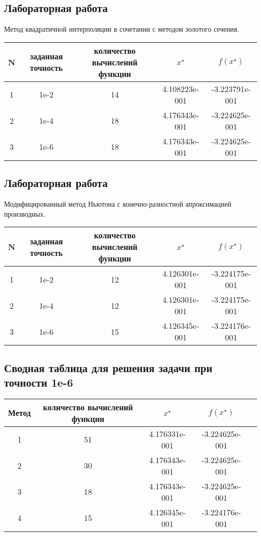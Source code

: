 \documentclass[a4paper,12pt]{article}
\begin{document}
\subsection{Лабораторная работа }
Метод квадратичной  интерполяции в сочетании с методом золотого сечения.
\begin{table}[!ht]
  \begin{tabular}{|c|c|c|c|c|}
  \hline
  N & заданная точность & количество вычислений функции & $x^{\star}$ & $f(x^{\star})$ \\
  \hline
  1 & 1e-2 & 14 & 4.108223e-001 & -3.223791e-001 \\
  \hline
  2 & 1e-4 & 18 & 4.176343e-001 & -3.224625e-001 \\
  \hline
  3 & 1e-6 & 18 & 4.176343e-001 & -3.224625e-001
 \\
  \hline
  \end{tabular}
\end{table}


\subsection{Лабораторная работа }
Модифицированный метод Ньютона с конечно-разностной апроксимацией производных.
\begin{table}[!ht]
  \begin{tabular}{|c|c|c|c|c|}
  \hline
  N & заданная точность & количество вычислений функции & $x^{\star}$ & $f(x^{\star})$ \\
  \hline
  1 & 1e-2 & 12 & 4.126301e-001 & -3.224175e-001 \\
  \hline
  2 & 1e-4 & 12 & 4.126301e-001 & -3.224175e-001 \\
  \hline
  3 & 1e-6 & 15 & 4.126345e-001 & -3.224176e-001
 \\
  \hline
  \end{tabular}
\end{table}

\newpage

\subsection{Сводная таблица для решения задачи при точности 1e-6}
\begin{table}[!ht]
  \begin{tabular}{|c|c|c|c|c|}
  \hline
  Метод & количество вычислений функции & $x^{\star}$ & $f(x^{\star})$ \\
  \hline
  1 & 51 & 4.176331e-001 & -3.224625e-001 \\
  \hline
  2 & 30 & 4.176343e-001 & -3.224625e-001 \\
  \hline
  3 & 18 & 4.176343e-001 & -3.224625e-001 \\
  \hline
  4 & 15 & 4.126345e-001 & -3.224176e-001 \\
  \hline
  \end{tabular}
\end{table} 
 
\end{document}
